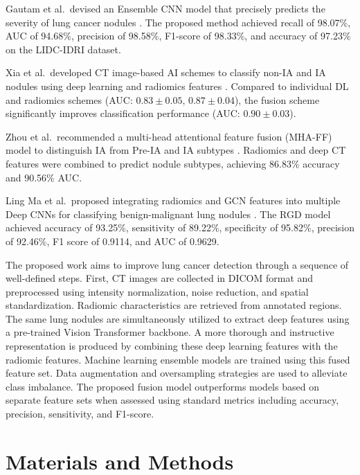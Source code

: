 \documentclass{iopjournal}
\begin{document}
Gautam et al.\ devised an Ensemble CNN model that precisely predicts the
severity of lung cancer nodules \cite{gautam2024lung}. The proposed method
achieved recall of 98.07\%, AUC of 94.68\%, precision of 98.58\%, F1-score of
98.33\%, and accuracy of 97.23\% on the LIDC-IDRI dataset.

Xia et al.\ developed CT image-based AI schemes to classify non-IA and IA
nodules using deep learning and radiomics features \cite{xia2020comparison}.
Compared to individual DL and radiomics schemes (AUC: $0.83\pm0.05$,
$0.87\pm0.04$), the fusion scheme significantly improves classification
performance (AUC: $0.90\pm0.03$).

Zhou et al.\ recommended a multi-head attentional feature fusion (MHA-FF)
model to distinguish IA from Pre-IA and IA subtypes \cite{zhou2023adaptive}.
Radiomics and deep CT features were combined to predict nodule subtypes,
achieving 86.83\% accuracy and 90.56\% AUC.

Ling Ma et al.\ proposed integrating radiomics and GCN features into multiple
Deep CNNs for classifying benign-malignant lung
nodules \cite{ma2023novel}. The RGD model achieved accuracy of 93.25\%,
sensitivity of 89.22\%, specificity of 95.82\%, precision of 92.46\%, F1 score
of 0.9114, and AUC of 0.9629.

The proposed work aims to improve lung cancer detection through a sequence of
well-defined steps. First, CT images are collected in DICOM format and
preprocessed using intensity normalization, noise reduction, and spatial
standardization. Radiomic characteristics are retrieved from annotated regions.
The same lung nodules are simultaneously utilized to extract deep features using
a pre-trained Vision Transformer backbone. A more thorough and instructive
representation is produced by combining these deep learning features with the
radiomic features. Machine learning ensemble models are trained using this fused
feature set. Data augmentation and oversampling strategies are used to alleviate
class imbalance. The proposed fusion model outperforms models based on separate
feature sets when assessed using standard metrics including accuracy, precision,
sensitivity, and F1-score.

\section{Materials and Methods}\label{sec2}
\end{document}
